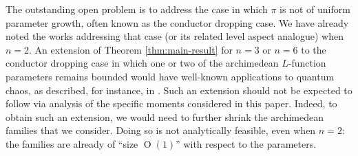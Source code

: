 \documentclass[reqno]{amsart}
\def\O{\operatorname{O}}
\theoremstyle{plain} \newtheorem{theorem} {Theorem}
\theoremstyle{definition} \newtheorem{definition} [theorem] {Definition}
\theoremstyle{itplain} %
\numberwithin{equation}{section}
\numberwithin{theorem}{section}
\begin{document}
The outstanding open problem is to address the case in which $\pi$ is not of uniform parameter growth, often known as the conductor dropping case.  We have already noted the works \cite{MR1923476, MR2382859, Mi04, michel-2009, MR3912807} addressing that case (or its related level aspect analogue) when $n=2$.  An extension of Theorem \ref{thm:main-result} for $n=3$ or $n=6$ to the conductor dropping case in which one or two of the archimedean $L$-function parameters remains bounded would have well-known applications to quantum chaos, as described, for instance, in \cite{MR1826269, watson-2008, MR2680499, PDN-AP-AS-que, sarnak-progress-que, 2020arXiv200108704N}.  Such an extension should not be expected to follow via analysis of the specific moments considered in this paper.  Indeed, to obtain such an extension, we would need to further shrink the archimedean families that we consider.  Doing so is not analytically feasible, even when $n=2$: the families are already of ``size $\O(1)$'' with respect to the parameters.
\end{document}
